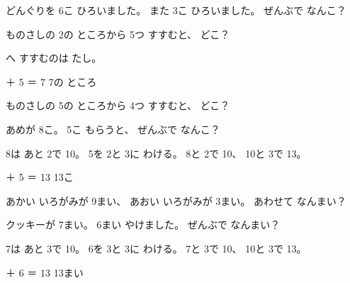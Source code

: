 \begin{jibun}
どんぐりを 6こ ひろいました。 また 3こ ひろいました。 ぜんぶで なんこ？
\bkshikiran
{}
\end{jibun}

\begin{reidai}
ものさしの 2の ところから 5つ すすむと、 どこ？
\begin{bkfigure}
\end{bkfigure}
\kangaekata {}へ すすむのは たし。

 ＋ 5 ＝ 7 \kotaenext 7の ところ
\end{reidai}

\begin{jibun}
ものさしの 5の ところから 4つ すすむと、 どこ？
\bkshikiran[9\zw]
\end{jibun}

\begin{reidai}[10を こえる]
あめが 8こ。 5こ もらうと、 ぜんぶで なんこ？

\kangaekata 8は あと 2で 10。 5を 2と 3に わける。 8と 2で 10、 10と 3で 13。

 ＋ 5 ＝ 13 \kotaenext 13こ
\end{reidai}

\begin{jibun}
あかい いろがみが 9まい、 あおい いろがみが 3まい。 あわせて なんまい？
\bkshikiran
{}
\end{jibun}

\begin{reidai}[10を こえる（もう 1つ）]
クッキーが 7まい。 6まい やけました。 ぜんぶで なんまい？

\noindent\begin{minipage}[c]{0.56\linewidth}
\kangaekata 7は あと 3で 10。 6を 3と 3に わける。 7と 3で 10、 10と 3で 13。

 ＋ 6 ＝ 13 \kotaenext 13まい
\end{minipage}\hfill
\begin{minipage}[c]{0.42\linewidth}\centering
{}
\end{minipage}
\end{reidai}

